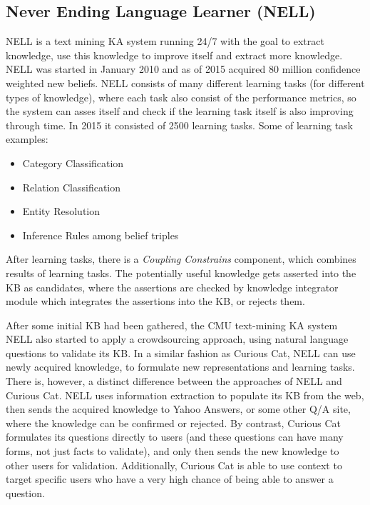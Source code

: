 \subsection{Never Ending Language Learner (NELL)}
\label{section:r:nell}
NELL\parencite{Mitchell2015} is a text mining KA system running 24/7 with the
goal to extract knowledge, use this knowledge to improve itself and extract
more knowledge. NELL was started in January 2010 and as of 2015 acquired
80 million confidence weighted new beliefs. NELL consists of many different
learning tasks (for different types of knowledge), where each task also consist
of the performance metrics, so the system can asses itself and check if the 
learning task itself is also improving through time. In 2015 it consisted of
2500 learning tasks. Some of learning task examples:
\begin{itemize}
	\item Category Classification
	\item Relation Classification
	\item Entity Resolution
	\item Inference Rules among belief triples
\end{itemize}
After learning tasks, there is a \emph{Coupling Constrains} component, which
combines results of learning tasks. The potentially useful knowledge gets
asserted into the KB as candidates, where the assertions are checked by knowledge
integrator module which integrates the assertions into the KB, or rejects them.

After some initial KB had been gathered, the CMU text-mining KA system 
NELL also started to apply a crowdsourcing approach\parencite{Pedro2012a},
using natural language questions to validate its KB. In a similar
fashion as Curious Cat, NELL can use newly acquired knowledge, to 
formulate new representations and learning tasks. There is, however, a 
distinct difference between the approaches of NELL and Curious Cat. 
NELL uses information extraction to populate its KB from the web, 
then sends the acquired knowledge to Yahoo Answers, or some other Q/A site, 
where the knowledge can be confirmed or rejected. 
By contrast, Curious Cat formulates its questions directly to users 
(and these questions can have many forms, not just facts to validate), 
and only then sends the new knowledge to other users for validation. 
Additionally, Curious Cat is able to use context to target specific users who 
have a very high chance of being able to answer a question.

